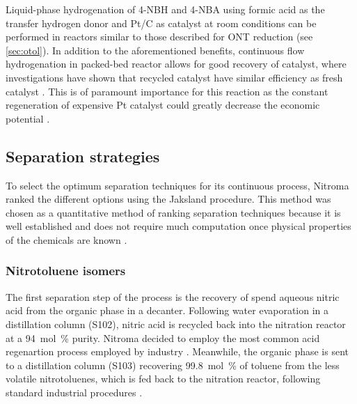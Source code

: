 Liquid-phase hydrogenation of 4-NBH and 4-NBA using formic acid as the transfer hydrogen donor and Pt/C as catalyst at room conditions can be performed in reactors similar to those described for ONT reduction (see \cref{sec:otol}). In addition to the aforementioned benefits, continuous flow hydrogenation in packed-bed reactor allows for good recovery of catalyst, where investigations have shown that recycled catalyst have similar efficiency as fresh catalyst \cite{rahman_fast_2020}. This is of paramount importance for this reaction as the constant regeneration of expensive Pt catalyst could greatly decrease the economic potential \cite{rahman_fast_2020}. 


\subsection{Separation strategies}

To select the optimum separation techniques for its continuous process, Nitroma ranked the different options using the Jaksland procedure. This method was chosen as a quantitative method of ranking separation techniques because it is well established and does not require much computation once physical properties of the chemicals are known \cite{jaksland_separation_1995}. 

\subsubsection{Nitrotoluene isomers}

The first separation step of the process is the recovery of spend  aqueous nitric acid from the organic phase in a decanter. Following water evaporation in a distillation column (S102), nitric acid is recycled back into the nitration reactor at a \SI{94}{mol\percent} purity. Nitroma decided to employ the most common acid regenartion process employed by industry \cite{dugal_nitrobenzene_2005}. Meanwhile, the organic phase is sent to a distillation column (S103) recovering \SI{99.8}{mol\percent} of toluene from the less volatile nitrotoluenes, which is fed back to the nitration reactor, following standard industrial procedures \cite{bowers_toluidines_2000}.

